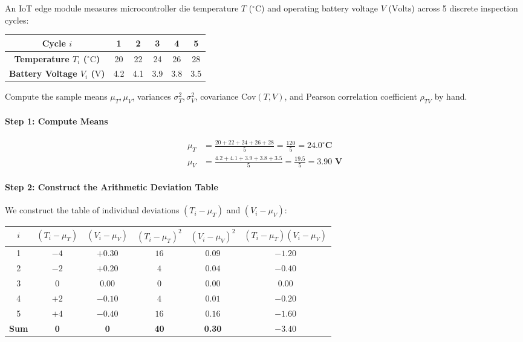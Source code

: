 \begin{example}
An IoT edge module measures microcontroller die temperature $T$ ($^\circ\text{C}$) and operating battery voltage $V$ ($\text{Volts}$) across 5 discrete inspection cycles:
\begin{center}
\begin{tabular}{cccccc}
\toprule
\textbf{Cycle $i$} & 1 & 2 & 3 & 4 & 5 \\
\midrule
\textbf{Temperature $T_i$ ($^\circ\text{C}$)} & 20 & 22 & 24 & 26 & 28 \\
\textbf{Battery Voltage $V_i$ ($\text{V}$)} & 4.2 & 4.1 & 3.9 & 3.8 & 3.5 \\
\bottomrule
\end{tabular}
\end{center}
Compute the sample means $\mu_T, \mu_V$, variances $\sigma_T^2, \sigma_V^2$, covariance $\text{Cov}(T, V)$, and Pearson correlation coefficient $\rho_{TV}$ by hand.

\paragraph{Step 1: Compute Means}
\begin{align*}
\mu_T &= \frac{20 + 22 + 24 + 26 + 28}{5} = \frac{120}{5} = \mathbf{24.0^\circ\text{C}} \\
\mu_V &= \frac{4.2 + 4.1 + 3.9 + 3.8 + 3.5}{5} = \frac{19.5}{5} = \mathbf{3.90\text{ V}}
\end{align*}

\paragraph{Step 2: Construct the Arithmetic Deviation Table}
We construct the table of individual deviations $(T_i - \mu_T)$ and $(V_i - \mu_V)$:
\begin{center}
\begin{tabular}{cccccc}
\toprule
$i$ & $(T_i - \mu_T)$ & $(V_i - \mu_V)$ & $(T_i - \mu_T)^2$ & $(V_i - \mu_V)^2$ & $(T_i - \mu_T)(V_i - \mu_V)$ \\
\midrule
1 & $-4$ & $+0.30$ & $16$ & $0.09$ & $-1.20$ \\
2 & $-2$ & $+0.20$ & $4$  & $0.04$ & $-0.40$ \\
3 & $0$  & $0.00$  & $0$  & $0.00$ & $0.00$ \\
4 & $+2$ & $-0.10$ & $4$  & $0.01$ & $-0.20$ \\
5 & $+4$ & $-0.40$ & $16$ & $0.16$ & $-1.60$ \\
\midrule
\textbf{Sum} & \textbf{0} & \textbf{0} & \textbf{40} & \textbf{0.30} & \textbf{$-3.40$} \\
\bottomrule
\end{tabular}
\end{center}


\end{example}
